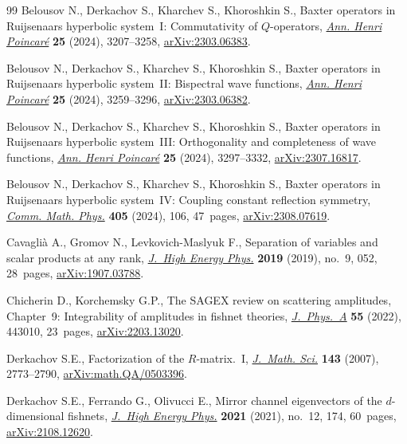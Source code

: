 \documentclass[pdftex]{sigma}
\numberwithin{equation}{section}
\begin{document}
\begin{thebibliography}{99}
Belousov N., Derkachov S., Kharchev S., Khoroshkin S., Baxter operators in
 {R}uijsenaars hyperbolic system~{I}: {C}ommutativity of {$Q$}-operators,
 \href{https://doi.org/10.1007/s00023-023-01364-4}{\textit{Ann. Henri
 Poincar\'e}} \textbf{25} (2024), 3207--3258,
 \href{http://arxiv.org/abs/2303.06383}{arXiv:2303.06383}.

Belousov N., Derkachov S., Kharchev S., Khoroshkin S., Baxter operators in
 {R}uijsenaars hyperbolic system~{II}: {B}ispectral wave functions,
 \href{https://doi.org/10.1007/s00023-023-01385-z}{\textit{Ann. Henri
 Poincar\'e}} \textbf{25} (2024), 3259--3296,
 \href{http://arxiv.org/abs/2303.06382}{arXiv:2303.06382}.

Belousov N., Derkachov S., Kharchev S., Khoroshkin S., Baxter operators in
 {R}uijsenaars hyperbolic system~{III}: {O}rthogonality and completeness of
 wave functions,
 \href{https://doi.org/10.1007/s00023-023-01406-x}{\textit{Ann. Henri
 Poincar\'e}} \textbf{25} (2024), 3297--3332,
 \href{http://arxiv.org/abs/2307.16817}{arXiv:2307.16817}.

Belousov N., Derkachov S., Kharchev S., Khoroshkin S., Baxter operators in
 {R}uijsenaars hyperbolic system~{IV}: {C}oupling constant reflection
 symmetry, \href{https://doi.org/10.1007/s00220-024-04952-5}{\textit{Comm.
 Math. Phys.}} \textbf{405} (2024), 106, 47~pages,
 \href{http://arxiv.org/abs/2308.07619}{arXiv:2308.07619}.

Cavagli\`a A., Gromov N., Levkovich-Maslyuk F., Separation of variables and
 scalar products at any rank,
 \href{https://doi.org/10.1007/jhep09(2019)052}{\textit{J.~High Energy Phys.}}
 \textbf{2019} (2019), no.~9, 052, 28~pages,
 \href{http://arxiv.org/abs/1907.03788}{arXiv:1907.03788}.

Chicherin D., Korchemsky G.P., The {SAGEX} review on scattering amplitudes,
 {C}hapter~9: {I}ntegrability of amplitudes in fishnet theories,
 \href{https://doi.org/10.1088/1751-8121/ac8c72}{\textit{J.~Phys.~A}}
 \textbf{55} (2022), 443010, 23~pages,
 \href{http://arxiv.org/abs/2203.13020}{arXiv:2203.13020}.

Derkachov S.E., Factorization of the {$R$}-matrix.~{I},
 \href{https://doi.org/10.1007/s10958-007-0164-8}{\textit{J.~Math. Sci.}}
 \textbf{143} (2007), 2773--2790,
 \href{http://arxiv.org/abs/math.QA/0503396}{arXiv:math.QA/0503396}.


Derkachov S.E., Ferrando G., Olivucci E., Mirror channel eigenvectors of the
 {$d$}-dimensional fishnets,
 \href{https://doi.org/10.1007/jhep12(2021)174}{\textit{J.~High Energy Phys.}}
 \textbf{2021} (2021), no.~12, 174, 60~pages,
 \href{http://arxiv.org/abs/2108.12620}{arXiv:2108.12620}.


\end{thebibliography}
\end{document}
